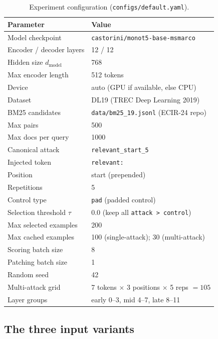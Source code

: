 \documentclass[11pt]{article}
\begin{document}
\begin{table}[H]
\centering
\caption{Experiment configuration (\texttt{configs/default.yaml}).}
\label{tab:config}
\begin{tabular}{ll}
\toprule
Parameter & Value \\
\midrule
Model checkpoint            & \texttt{castorini/monot5-base-msmarco} \\
Encoder / decoder layers    & 12 / 12 \\
Hidden size $d_{\text{model}}$ & 768 \\
Max encoder length          & 512 tokens \\
Device                      & auto (GPU if available, else CPU) \\
\midrule
Dataset                     & DL19 (TREC Deep Learning 2019) \\
BM25 candidates             & \texttt{data/bm25\_19.jsonl} (ECIR-24 repo) \\
Max pairs                   & 500 \\
Max docs per query          & 1000 \\
\midrule
Canonical attack            & \texttt{relevant\_start\_5} \\
Injected token              & \texttt{relevant:} \\
Position                    & start (prepended) \\
Repetitions                 & 5 \\
Control type                & \texttt{pad} (padded control) \\
\midrule
Selection threshold $\tau$  & 0.0 (keep all \texttt{attack > control}) \\
Max selected examples       & 200 \\
Max cached examples         & 100 (single-attack); 30 (multi-attack) \\
Scoring batch size          & 8 \\
Patching batch size         & 1 \\
Random seed                 & 42 \\
\midrule
Multi-attack grid           & 7 tokens $\times$ 3 positions $\times$ 5 reps $=105$ \\
Layer groups                & early 0--3, mid 4--7, late 8--11 \\
\bottomrule
\end{tabular}
\end{table}

\subsection{The three input variants}
\end{document}
